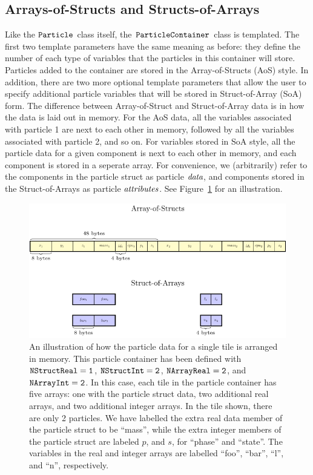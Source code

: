 \subsection{Arrays-of-Structs and Structs-of-Arrays}

Like the $\tt{Particle}$ class itself, the $\tt{ParticleContainer}$ class is templated. The first two template parameters have the same meaning as before: they define the number of each type of variables that the particles in this container will store. Particles added to the container are stored in the Array-of-Structs (AoS) style. In addition, there are two more optional template parameters that allow the user to specify additional particle variables that will be stored in Struct-of-Array (SoA) form. The difference between Array-of-Struct and Struct-of-Array data is in how the data is laid out in memory. For the AoS data, all the variables associated with particle 1 are next to each other in memory, followed by all the variables associated with particle 2, and so on. For variables stored in SoA style, all the particle data for a given component is next to each other in memory, and each component is stored in a seperate
array. For convenience, we (arbitrarily) refer to the components in the particle struct as particle $\emph{data}$, and components stored in the Struct-of-Arrays as particle
$\emph{attributes}$. See Figure~\ref{fig:particles:particle_arrays} for an illustration.

\begin{figure}
  \centering
  \includegraphics[width=\textwidth]{./Particle/particle_arrays.pdf}
  \caption{\label{fig:particles:particle_arrays} An illustration of how the particle data for a single tile is arranged in memory. This particle container has been defined with $\tt{NStructReal} = 1$, $\tt{NStructInt} = 2$, $\tt{NArrayReal} = 2$, and $\tt{NArrayInt} = 2$. In this case, each tile in the particle container has five arrays: one with the particle struct data, two additional real arrays, and two additional integer arrays. In the tile shown, there are only 2 particles. We have labelled the extra real data member of the particle struct to be ``mass'', while the extra integer members of the particle struct are labeled $p$, and $s$, for ``phase'' and ``state''. The variables in the real and integer arrays are labelled ``foo'', ``bar'', ``l'', and ``n'', respectively.}
\end{figure}

